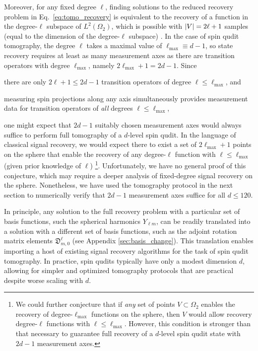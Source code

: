 \documentclass[notitlepage,twocolumn]{revtex4-2}
\renewcommand{\t}{\text} %
\newcommand{\p}[1]{\left(#1\right)} %
\newcommand{\1}{\mathds{1}}
\newcommand{\D}{\mathfrak{D}}
\begin{document}
Moreover, for any fixed degree $\ell$, finding solutions to the reduced recovery problem in Eq.~\eqref{eq:tomo_recovery} is equivalent to the recovery of a function in the degree-$\ell$ subspace of $L^2\p{\Omega_2}$, which is possible with $\abs{V}=2\ell+1$ samples (equal to the dimension of the degree-$\ell$ subspace) \cite{freeden2008spherical}.
In the case of spin qudit tomography, the degree $\ell$ takes a maximal value of $\ell_{\t{max}}\equiv d-1$, so state recovery requires at least as many measurement axes as there are transition operators with degree $\ell_{\t{max}}$, namely $2\ell_{\t{max}}+1=2d-1$.
Since
\begin{enumerate*}
\item there are only $2\ell+1\le2d-1$ transition operators of degree $\ell\le\ell_{\t{max}}$, and
\item measuring spin projections along any axis simultaneously provides measurement data for transition operators of {\it all} degrees $\ell\le\ell_{\t{max}}$,
\end{enumerate*}
one might expect that $2d-1$ suitably chosen measurement axes would always suffice to perform full tomography of a $d$-level spin qudit.
In the language of classical signal recovery, we would expect there to exist a set of $2\ell_{\t{max}}+1$ points on the sphere that enable the recovery of any degree-$\ell$ function with $\ell\le\ell_{\t{max}}$ (given prior knowledge of $\ell$) \footnote{We could further conjecture that if {\it any} set of points $V\subset\Omega_2$ enables the recovery of degree-$\ell_{\t{max}}$ functions on the sphere, then $V$ would allow recovery degree-$\ell$ functions with $\ell\le\ell_{\t{max}}$.  However, this condition is stronger than that necessary to guarantee full recovery of a $d$-level spin qudit state with $2d-1$ measurement axes.}.
Unfortunately, we have no general proof of this conjecture, which may require a deeper analysis of fixed-degree signal recovery on the sphere.
Nonetheless, we have used the tomography protocol in the next section to numerically verify that $2d-1$ measurement axes suffice for all $d\le120$.

In principle, any solution to the full recovery problem with a particular set of basis functions, such the spherical harmonics $Y_{\ell m}$, can be readily translated into a solution with a different set of basis functions, such as the adjoint rotation matrix elements $\D^\ell_{m,0}$ (see Appendix \ref{sec:basis_change}).
This translation enables importing a host of existing signal recovery algorithms \cite{mcewen2011novel, mcewen2011sampling, rauhut2011sparse, alem2012sparse, khalid2014optimaldimensionality} for the task of spin qudit tomography.
In practice, spin qudits typically have only a modest dimension $d$, allowing for simpler and optimized tomography protocols that are practical despite worse scaling with $d$.
\end{document}
